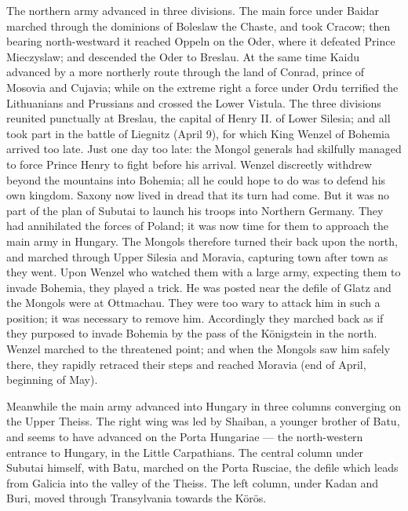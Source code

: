 The northern army advanced in three divisions. The main force under Baidar marched through the dominions of Boleslaw the Chaste, and took Cracow; then bearing north-westward it reached Oppeln on the Oder, where it defeated Prince Mieczyslaw; and descended the Oder to Breslau. At the same time Kaidu advanced by a more northerly route through the land of Conrad, prince of Mosovia and Cujavia; while on the extreme right a force under Ordu terrified the Lithuanians and Prussians and crossed the Lower Vistula. The three divisions reunited punctually at Breslau, the capital of Henry II. of Lower Silesia; and all took part in the battle of Liegnitz (April 9), for which King Wenzel of Bohemia arrived too late. Just one day too late: the Mongol generals had skilfully managed to force Prince Henry to fight before his arrival. Wenzel discreetly withdrew beyond the mountains into Bohemia; all he could hope to do was to defend his own kingdom. Saxony now lived in dread that its turn had come. But it was no part of the plan of Subutai to launch his troops into Northern Germany. They had annihilated the forces of Poland; it was now time for them to approach the main army in Hungary. The Mongols therefore turned their back upon the north, and marched through Upper Silesia and Moravia, capturing town after town as they went. Upon Wenzel who watched them with a large army, expecting them to invade Bohemia, they played a trick. He was posted near the defile of Glatz and the Mongols were at Ottmachau. They were too wary to attack him in such a position; it was necessary to remove him. Accordingly they marched back as if they purposed to invade Bohemia by the pass of the Königstein in the north. Wenzel marched to the threatened point; and when the Mongols saw him safely there, they rapidly retraced their steps and reached Moravia (end of April, beginning of May).

Meanwhile the main army advanced into Hungary in three columns converging on the Upper Theiss. The right wing was led by Shaiban, a younger brother of Batu, and seems to have advanced on the Porta Hungariae \texthebrew{—} the north-western entrance to Hungary, in the Little Carpathians. The central column under Subutai himself, with Batu, marched on the Porta Rusciae, the defile which leads from Galicia into the valley of the Theiss. The left column, under Kadan and Buri, moved through Transylvania towards the Körös.

